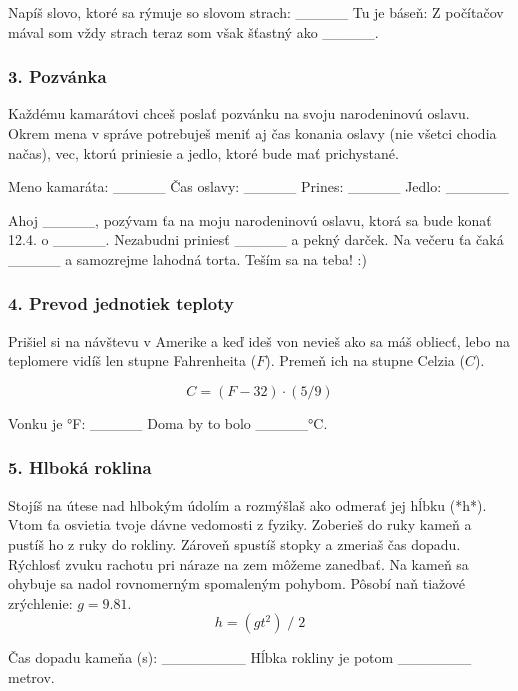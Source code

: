 \begin{code}
Napíš slovo, ktoré sa rýmuje so slovom strach: _____
Tu je báseň:
Z počítačov mával som vždy strach
teraz som však šťastný ako _____.
\end{code}

\subsubsection*{3. Pozvánka}
Každému kamarátovi chceš poslať pozvánku na svoju narodeninovú oslavu. Okrem mena v správe potrebuješ meniť aj čas konania oslavy (nie všetci chodia načas), vec, ktorú priniesie a jedlo, ktoré bude mať prichystané.

\begin{code}
Meno kamaráta: _____
Čas oslavy: _____
Prines: _____
Jedlo: ______

Ahoj _____,
pozývam ťa na moju narodeninovú oslavu, ktorá sa bude konať 12.4. o _____. Nezabudni priniesť _____ a pekný darček. Na večeru ťa čaká _____ a samozrejme lahodná torta. Teším sa na teba! :)
\end{code}

\subsubsection*{4. Prevod jednotiek teploty}
Prišiel si na návštevu v Amerike a keď ideš von nevieš ako sa máš obliecť, lebo na teplomere vidíš len stupne Fahrenheita ($F$). Premeň ich na stupne Celzia ($C$).

$$ C = (F - 32) \cdot (5 / 9) $$

\begin{code}
Vonku je °F: _____
Doma by to bolo _____°C.
\end{code}

\subsubsection*{5. Hlboká roklina}
Stojíš na útese nad hlbokým údolím a rozmýšlaš ako odmerať jej hĺbku (*h*). Vtom ťa osvietia tvoje dávne vedomosti z fyziky. Zoberieš do ruky kameň a pustíš ho z ruky do rokliny.
Zároveň spustíš stopky a zmeriaš čas dopadu. Rýchlosť zvuku rachotu pri náraze na zem môžeme zanedbať. Na kameň sa ohybuje sa nadol rovnomerným spomaleným pohybom. Pôsobí naň tiažové zrýchlenie: $g = 9.81$.
$$ h = (gt^2)\;/\; 2 $$

\begin{code}
Čas dopadu kameňa (s): ________
Hĺbka rokliny je potom _______ metrov.
\end{code}

